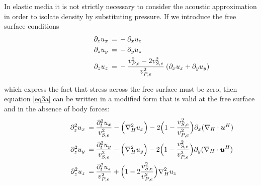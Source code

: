 \documentclass[]{article}
\begin{document}
	In elastic media it is not strictly necessary to consider the acoustic approximation in order to isolate density by substituting pressure. If we introduce the free surface conditions
	\begin{align}\shoveright \shoveright \shoveright \shoveright \shoveright \shoveright 
		\partial_{z} u_{x} \: =& \: - \partial_{x} u_{z}\label{eq:FS_cond1}\\ 
		\partial_{z} u_{y} \: =& \: - \partial_{y} u_{z} \label{eq:FS_cond2}\\
		\partial_{z} u_{z} \: =& \: - \frac{v_{P,e}^{2} - 2v_{S,e}^{2}}{v_{P,e}^{2}} \: (\partial_{x} u_{x} + \partial_{y} u_{y})
		\label{eq:FS_cond3}
	\end{align}
	
	which express the fact that stress across the free surface must be zero, then equation \eqref{eq3a} can be written in a modified form that is valid at the free surface and in the absence of body forces:	
	\begin{align}\shoveright \shoveright \shoveright \shoveright \shoveright \shoveright 
		\partial_{z}^{2} u_{x} \: =& \: \frac{\partial_{t}^{2} u_{x} }{v_{S,e}^{2}} - \Big(\nabla_{H}^{2}u_{x} \Big) - 2\Big(1-\frac{v_{S,e}^{2}}{v_{P,e}^{2}} \Big) \partial_{x} (\nabla_{H} \cdot \bm{u}^{H})\label{eq:FS_eq2a_1} \\ 
		\partial_{z}^{2} u_{y} \: =& \: \frac{\partial_{t}^{2} u_{y} }{v_{S,e}^{2}} - \Big(\nabla_{H}^{2}u_{y}  \Big) - 2\Big(1-\frac{v_{S,e}^{2}}{v_{P,e}^{2}} \Big) \partial_{y} (\nabla_{H} \cdot \bm{u}^{H})\label{eq:FS_eq2a_2}\\
		\partial_{z}^{2} u_{z} \: =& \: \frac{\partial_{t}^{2} u_{z} }{v_{P,e}^{2}} + \Big(1-2\frac{v_{S,e}^{2}}{v_{P,e}^{2}} \Big) \nabla^{2}_{H}u_{z}
		\label{eq:FS_eq2a_3}
	\end{align}
	
\end{document}
